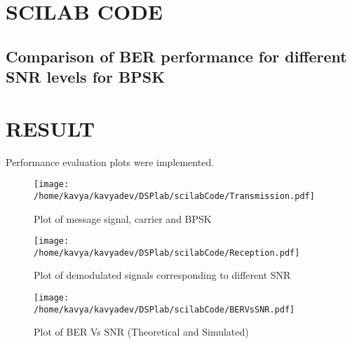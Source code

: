 \section{SCILAB CODE}
\subsection*{Comparison of BER performance for different SNR levels for BPSK}




\section{RESULT}
Performance evaluation plots were implemented.

\begin{figure}
\texttt{[image: /home/kavya/kavyadev/DSPlab/scilabCode/Transmission.pdf]}
\caption{Plot of message signal, carrier and BPSK}
\label{transmission}
\end{figure}


\begin{figure}
\texttt{[image: /home/kavya/kavyadev/DSPlab/scilabCode/Reception.pdf]}
\caption{Plot of demodulated signals corresponding to different SNR}
\label{reception}
\end{figure}


\begin{figure}
\texttt{[image: /home/kavya/kavyadev/DSPlab/scilabCode/BERVsSNR.pdf]}
\caption{Plot of BER Vs SNR (Theoretical and Simulated)}
\label{BER Vs SNR}
\end{figure}
